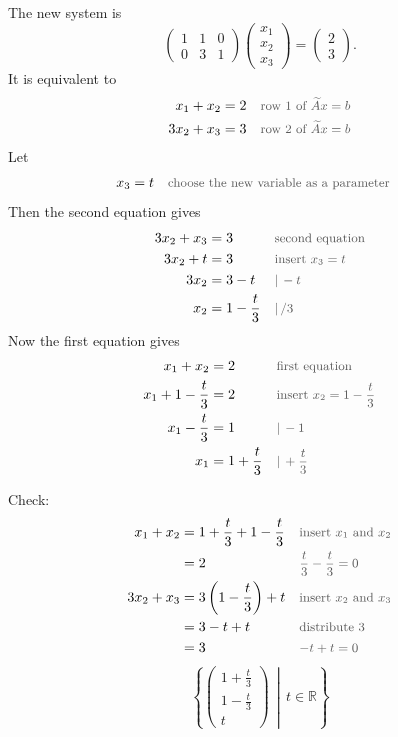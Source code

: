 \documentclass[a4paper,11pt]{article}
\newif\ifexplain
\newcommand{\why}[1]{\text{\small\color{black!65}#1}}
\newcommand{\explain}[1]{\ifexplain\begin{erklbox}#1\end{erklbox}\fi}
\begin{document}
The new system is
\[
\begin{pmatrix}1&1&0\\0&3&1\end{pmatrix}
\begin{pmatrix}x_1\\x_2\\x_3\end{pmatrix}
=
\begin{pmatrix}2\\3\end{pmatrix}.
\]
It is equivalent to
\begin{align*}
x_1+x_2&=2 && \why{row $1$ of $\widetilde Ax=b$}\\
3x_2+x_3&=3 && \why{row $2$ of $\widetilde Ax=b$}
\end{align*}
Let
\begin{align*}
x_3&=t && \why{choose the new variable as a parameter}
\end{align*}
Then the second equation gives
\begin{align*}
3x_2+x_3&=3 && \why{second equation}\\
3x_2+t&=3 && \why{insert $x_3=t$}\\
3x_2&=3-t && \why{$|\,-t$}\\
x_2&=1-\frac{t}{3} && \why{$|\,/3$}
\end{align*}
Now the first equation gives
\begin{align*}
x_1+x_2&=2 && \why{first equation}\\
x_1+1-\frac{t}{3}&=2 && \why{insert $x_2=1-\frac{t}{3}$}\\
x_1-\frac{t}{3}&=1 && \why{$|\,-1$}\\
x_1&=1+\frac{t}{3} && \why{$|\,+\frac{t}{3}$}
\end{align*}
\explain{Der Parameter $t$ kann jede reelle Zahl sein. Daher ist die neue Lösungsmenge eine Gerade im dreidimensionalen Raum.}
Check:
\begin{align*}
x_1+x_2&=1+\frac{t}{3}+1-\frac{t}{3} && \why{insert $x_1$ and $x_2$}\\
&=2 && \why{$\frac{t}{3}-\frac{t}{3}=0$}\\
3x_2+x_3&=3\left(1-\frac{t}{3}\right)+t && \why{insert $x_2$ and $x_3$}\\
&=3-t+t && \why{distribute $3$}\\
&=3 && \why{$-t+t=0$}
\end{align*}
\[
\boxed{\left\{\begin{pmatrix}1+\frac{t}{3}\\[1mm]1-\frac{t}{3}\\[1mm]t\end{pmatrix}\,\middle|\,t\in\mathbb R\right\}}
\]
\end{document}
